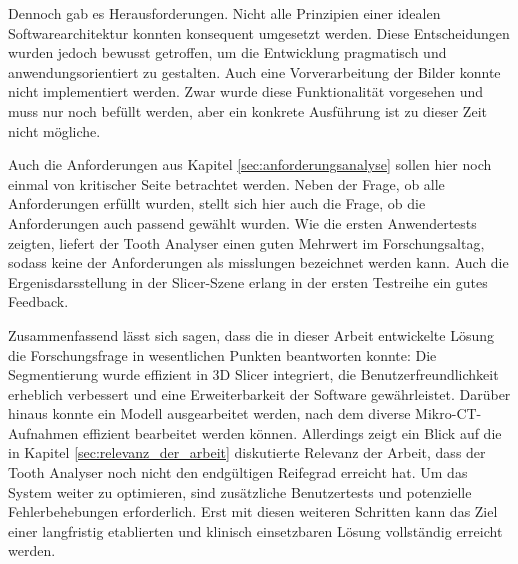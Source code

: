 Dennoch gab es Herausforderungen. Nicht alle Prinzipien einer idealen
Softwarearchitektur konnten konsequent umgesetzt werden. Diese Entscheidungen wurden
jedoch bewusst getroffen, um die Entwicklung pragmatisch und
anwendungsorientiert zu gestalten. Auch eine Vorverarbeitung der Bilder konnte nicht
implementiert werden. Zwar wurde diese Funktionalität vorgesehen und muss nur
noch befüllt werden, aber ein konkrete Ausführung ist zu dieser Zeit nicht mögliche.

Auch die Anforderungen aus Kapitel \ref{sec:anforderungsanalyse} sollen hier noch
einmal von kritischer Seite betrachtet werden. Neben der Frage, ob alle Anforderungen
erfüllt wurden, stellt sich hier auch die Frage, ob die Anforderungen auch passend
gewählt wurden. Wie die ersten Anwendertests zeigten, liefert der Tooth Analyser
einen guten Mehrwert im Forschungsaltag, sodass keine der Anforderungen als
misslungen bezeichnet werden kann. Auch die Ergenisdarsstellung in der Slicer-Szene
erlang in der ersten Testreihe ein gutes Feedback.

Zusammenfassend lässt sich sagen, dass die in dieser Arbeit entwickelte Lösung
die Forschungsfrage in wesentlichen Punkten beantworten konnte: Die Segmentierung
wurde effizient in 3D Slicer integriert, die Benutzerfreundlichkeit erheblich
verbessert und eine Erweiterbarkeit der Software gewährleistet. Darüber hinaus konnte
ein Modell ausgearbeitet werden, nach dem diverse Mikro-CT-Aufnahmen effizient
bearbeitet werden können. Allerdings zeigt ein Blick auf die in Kapitel \ref{sec:relevanz_der_arbeit}
diskutierte Relevanz der Arbeit, dass der Tooth Analyser noch nicht den
endgültigen Reifegrad erreicht hat. Um das System weiter zu optimieren, sind
zusätzliche Benutzertests und potenzielle Fehlerbehebungen erforderlich. Erst mit
diesen weiteren Schritten kann das Ziel einer langfristig etablierten und klinisch
einsetzbaren Lösung vollständig erreicht werden.
